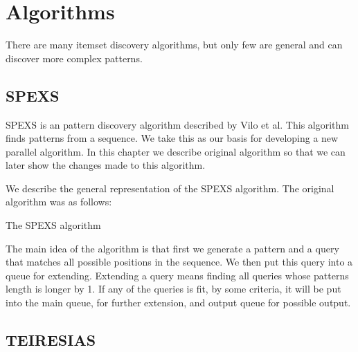 \chapter{Algorithms}

There are many itemset discovery algorithms, but only few are general and can discover more complex patterns.

\section{SPEXS}

SPEXS is an pattern discovery algorithm described by Vilo et al.
This algorithm finds patterns from a sequence.
We take this as our basis for developing a new parallel algorithm.
In this chapter we describe original algorithm so that we can
later show the changes made to this algorithm.

We describe the general representation of the SPEXS algorithm. 
The original algorithm was as follows:


\begin{algorithm}[H]
	\caption{The SPEXS algorithm}
\begin{algorithmic}[1]



				\EndIf
			\EndIf
		\EndFor
	\EndWhile
\end{algorithmic}
\end{algorithm}

The main idea of the algorithm is that first we generate a 
pattern and a query that matches all possible positions in 
the sequence. We then put this query into a queue for extending.
Extending a query means finding all queries whose patterns length
is longer by 1. If any of the queries is fit, by some criteria,
it will be put into the main queue, for further extension, 
and output queue for possible output.

\section{TEIRESIAS}

